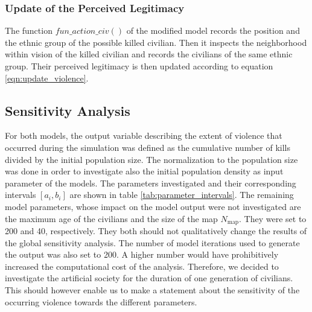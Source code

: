\documentclass[11pt]{article}
\begin{document}
\subsubsection{Update of the Perceived Legitimacy}
The function $fun\_action\_civ()$ of the modified model records the position and the ethnic group of the possible killed civilian. Then it inspects the neighborhood within vision of the killed civilian and records the civilians of the same ethnic group. Their perceived legitimacy is then updated according to equation \eqref{eqn:update_violence}.

\subsection{Sensitivity Analysis}
For both models, the output variable describing the extent of violence that occurred during the simulation was defined as the cumulative number of kills divided by the initial population size. The normalization to the population size was done in order to investigate also the initial population density as input parameter of the models. The parameters investigated and their corresponding intervals $[a_i,b_i]$ are shown in table \ref{tab:parameter_intervals}. The remaining model parameters, whose impact on the model output were not investigated are the maximum age of the civilians and the size of the map $N_{\text{map}}$. They were set to 200 and 40, respectively. They both should not qualitatively change the results of the global sensitivity analysis. The number of model iterations used to generate the output was also set to 200. A higher number would have prohibitively increased the computational cost of the analysis. Therefore, we decided to investigate the artificial society for the duration of one generation of civilians. This should however enable us to make a statement about the sensitivity of the occurring violence towards the different parameters.
\end{document}
